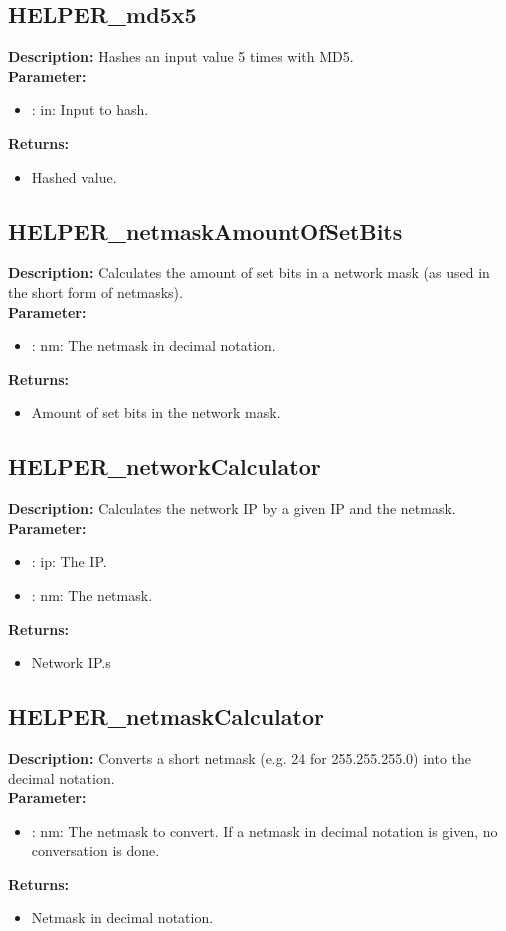 \subsection{HELPER\_md5x5}
\textbf{Description:} Hashes an input value 5 times with MD5.\\
\textbf{Parameter:}
\begin{itemize}
\item : in: Input to hash.
\end{itemize}
\textbf{Returns:}
\begin{itemize}
\item Hashed value.
\end{itemize}

\subsection{HELPER\_netmaskAmountOfSetBits}
\textbf{Description:} Calculates the amount of set bits in a network mask (as used in the short form of netmasks).\\
\textbf{Parameter:}
\begin{itemize}
\item : nm: The netmask in decimal notation.
\end{itemize}
\textbf{Returns:}
\begin{itemize}
\item Amount of set bits in the network mask.
\end{itemize}

\subsection{HELPER\_networkCalculator}
\textbf{Description:} Calculates the network IP by a given IP and the netmask.\\
\textbf{Parameter:}
\begin{itemize}
\item : ip: The IP.
\item : nm: The netmask.
\end{itemize}
\textbf{Returns:}
\begin{itemize}
\item Network IP.s
\end{itemize}

\subsection{HELPER\_netmaskCalculator}
\textbf{Description:} Converts a short netmask (e.g. 24 for 255.255.255.0) into the decimal notation.\\
\textbf{Parameter:}
\begin{itemize}
\item : nm: The netmask to convert. If a netmask in decimal notation is given, no conversation is done.
\end{itemize}
\textbf{Returns:}
\begin{itemize}
\item Netmask in decimal notation.
\end{itemize}

